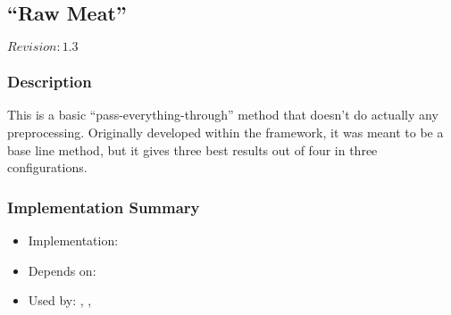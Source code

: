 \subsection{``Raw Meat''}

$Revision: 1.3 $

\subsubsection{Description}

This is a basic ``pass-everything-through'' method that doesn't
do actually any preprocessing. Originally developed within the
framework, it was meant to be a base line method, but it gives
three best results out of four in three configurations.

\subsubsection{Implementation Summary}

\begin{itemize}
\item Implementation: 
\item Depends on: 
\item Used by: , , 
\end{itemize}



